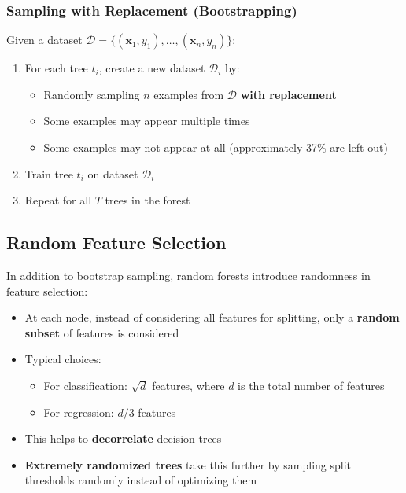 \documentclass[11pt,a4paper]{article}
\theoremstyle{definition}
\theoremstyle{plain}
\theoremstyle{remark}
\begin{document}
\subsubsection{Sampling with Replacement (Bootstrapping)}

Given a dataset \(\mathcal{D} = \{(\mathbf{x}_1, y_1), \ldots, (\mathbf{x}_n, y_n)\}\):

\begin{enumerate}
    \item For each tree \(t_i\), create a new dataset \(\mathcal{D}_i\) by:
    \begin{itemize}
        \item Randomly sampling \(n\) examples from \(\mathcal{D}\) \textbf{with replacement}
        \item Some examples may appear multiple times
        \item Some examples may not appear at all (approximately 37\% are left out)
    \end{itemize}
    
    \item Train tree \(t_i\) on dataset \(\mathcal{D}_i\)
    
    \item Repeat for all \(T\) trees in the forest
\end{enumerate}

\subsection{Random Feature Selection}

In addition to bootstrap sampling, random forests introduce randomness in feature selection:

\begin{itemize}
    \item At each node, instead of considering all features for splitting, only a \textbf{random subset} of features is considered
    
    \item Typical choices:
    \begin{itemize}
        \item For classification: \(\sqrt{d}\) features, where \(d\) is the total number of features
        \item For regression: \(d/3\) features
    \end{itemize}
    
    \item This helps to \textbf{decorrelate} decision trees
    
    \item \textbf{Extremely randomized trees} take this further by sampling split thresholds randomly instead of optimizing them
\end{itemize}
\end{document}
